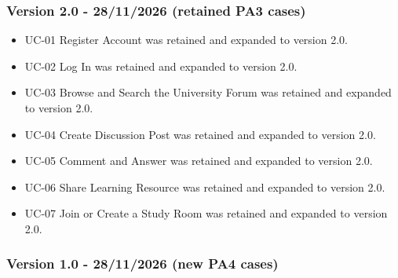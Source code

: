 \documentclass[12pt]{article}
\begin{document}
\hypertarget{sec:version-2-0-28-11-2026-retained-pa3-cases}{}
\subsubsection*{Version 2.0 - 28/11/2026 (retained PA3 cases)}
\par\medskip

\begin{itemize}
\item UC-01 Register Account was retained and expanded to version 2.0.
\item UC-02 Log In was retained and expanded to version 2.0.
\item UC-03 Browse and Search the University Forum was retained and expanded to version 2.0.
\item UC-04 Create Discussion Post was retained and expanded to version 2.0.
\item UC-05 Comment and Answer was retained and expanded to version 2.0.
\item UC-06 Share Learning Resource was retained and expanded to version 2.0.
\item UC-07 Join or Create a Study Room was retained and expanded to version 2.0.
\end{itemize}
\par\medskip

\hypertarget{sec:version-1-0-28-11-2026-new-pa4-cases}{}
\subsubsection*{Version 1.0 - 28/11/2026 (new PA4 cases)}
\par\medskip
\end{document}
